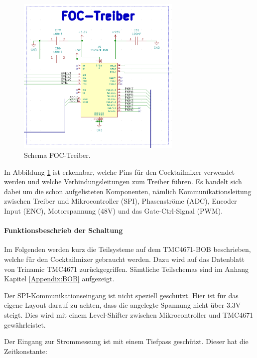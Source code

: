 \begin{figure}[H]
	\centering
	\includegraphics[width=0.7\textwidth]{graphics/Schema_FOC_Treiber}
	\caption{Schema FOC-Treiber.}
	\label{fig:Schema_FOC_Treiber}
\end{figure} 

In Abbildung \ref{fig:Schema_FOC_Treiber} ist erkennbar, welche Pins für den Cocktailmixer verwendet werden und welche Verbindungsleitungen zum Treiber führen. Es handelt sich dabei um die schon aufgelisteten Komponenten, nämlich Kommunikationsleitung zwischen Treiber und Mikrocontroller (SPI), Phasenströme (ADC), Encoder Input (ENC), Motorspannung (48V) und das Gate-Ctrl-Signal (PWM).

\paragraph{Funktionsbeschrieb der Schaltung}\mbox{}

Im Folgenden werden kurz die Teilsysteme auf dem TMC4671-BOB beschrieben, welche für den Cocktailmixer gebraucht werden. Dazu wird auf das Datenblatt von Trinamic TMC4671 zurückgegriffen. Sämtliche Teilschemas sind im Anhang Kapitel \ref{Appendix:BOB} aufgezeigt.


Der SPI-Kommunikationseingang ist nicht speziell geschützt. Hier ist für das eigene Layout darauf zu achten, dass die angelegte Spannung nicht über 3.3V steigt. Dies wird mit einem Level-Shifter zwischen Mikrocontroller und TMC4671 gewährleistet.


Der Eingang zur Strommessung ist mit einem Tiefpass geschützt. Dieser hat die Zeitkonstante:

